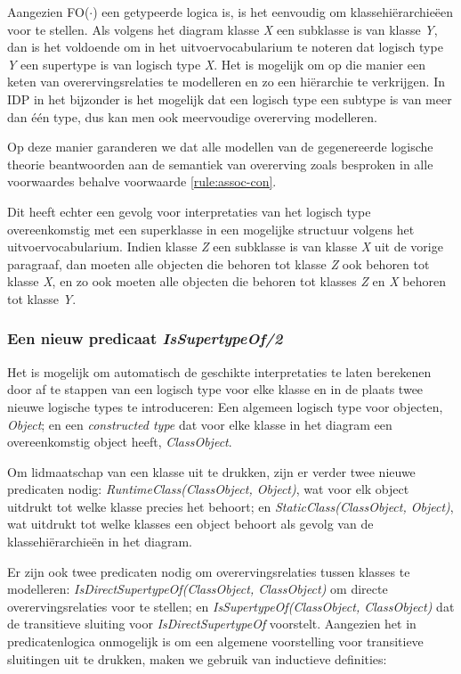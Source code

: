Aangezien FO($\cdot$) een getypeerde logica is, is het eenvoudig om klassehi\"erarchie\"een voor te stellen. Als volgens het diagram klasse \textit{X} een subklasse is van klasse \textit{Y}, dan is het voldoende om in het uitvoervocabularium te noteren dat logisch type \textit{Y} een supertype is van logisch type \textit{X}. Het is mogelijk om op die manier een keten van overervingsrelaties te modelleren en zo een hi\"erarchie te verkrijgen. In IDP in het bijzonder is het mogelijk dat een logisch type een subtype is van meer dan \'e\'en type, dus kan men ook meervoudige overerving modelleren.

Op deze manier garanderen we dat alle modellen van de gegenereerde logische theorie beantwoorden aan de semantiek van overerving zoals besproken in alle voorwaardes behalve voorwaarde \ref{rule:assoc-con}.

Dit heeft echter een gevolg voor interpretaties van het logisch type overeenkomstig met een superklasse in een mogelijke structuur volgens het uitvoervocabularium. Indien klasse \textit{Z} een subklasse is van klasse \textit{X} uit de vorige paragraaf, dan moeten alle objecten die behoren tot klasse \textit{Z} ook behoren tot klasse \textit{X}, en zo ook moeten alle objecten die behoren tot klasses \textit{Z} en \textit{X} behoren tot klasse \textit{Y}.

\subsubsection{Een nieuw predicaat \textit{IsSupertypeOf/2}}

Het is mogelijk om automatisch de geschikte interpretaties te laten berekenen door af te stappen van een logisch type voor elke klasse en in de plaats twee nieuwe logische types te introduceren: Een algemeen logisch type voor objecten, \textit{Object}; en een \textit{constructed type}\cite{DeCatBroes2014PLaa} dat voor elke klasse in het diagram een overeenkomstig object heeft, \textit{ClassObject}.

Om lidmaatschap van een klasse uit te drukken, zijn er verder twee nieuwe predicaten nodig: \textit{RuntimeClass(ClassObject, Object)}, wat voor elk object uitdrukt tot welke klasse precies het behoort; en \textit{StaticClass(ClassObject, Object)}, wat uitdrukt tot welke klasses een object behoort als gevolg van de klassehi\"erarchie\"en in het diagram.

Er zijn ook twee predicaten nodig om overervingsrelaties tussen klasses te modelleren: \textit{IsDirectSupertypeOf(ClassObject, ClassObject)} om directe overervingsrelaties voor te stellen; en \textit{IsSupertypeOf(ClassObject, ClassObject)} dat de transitieve sluiting voor \textit{IsDirectSupertypeOf} voorstelt. Aangezien het in predicatenlogica onmogelijk is om een algemene voorstelling voor transitieve sluitingen uit te drukken, maken we gebruik van inductieve definities\cite{DeCatBroes2014PLaa}:

